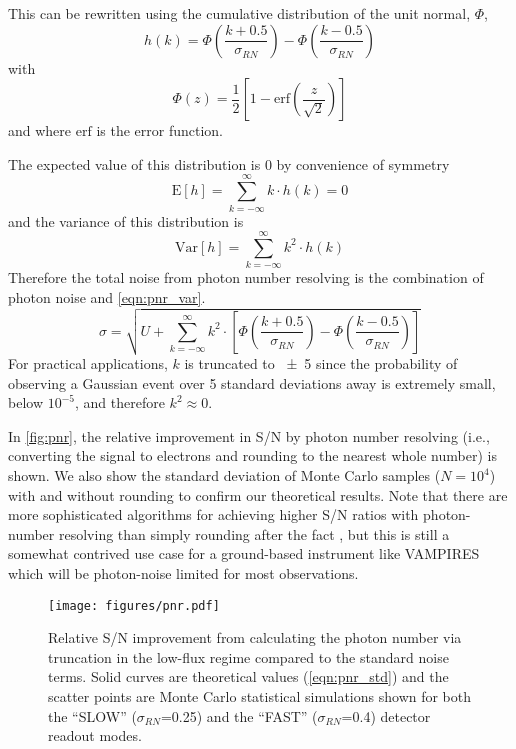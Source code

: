 This can be rewritten using the cumulative distribution of the unit normal, $\Phi$, 
\begin{equation}
    h(k) = \Phi\left(\frac{k + 0.5}{\sigma_{RN}} \right) - \Phi\left(\frac{k - 0.5}{\sigma_{RN}} \right)
\end{equation}
with
\begin{equation}
    \Phi(z) = \frac12 \left[1 - \mathrm{erf}\left(\frac{z}{\sqrt{2}}\right) \right]
\end{equation}
and where $\mathrm{erf}$ is the error function.

The expected value of this distribution is 0 by convenience of symmetry
\begin{equation}
    \mathrm{E}[h] = \sum_{k=-\infty}^{\infty}{ k \cdot h(k)} = 0
\end{equation}
and the variance of this distribution is
\begin{equation}
\label{eqn:pnr_var}
    \mathrm{Var}[h] = \sum_{k=-\infty}^{\infty}{ k^2\cdot h(k)}
\end{equation}
Therefore the total noise from photon number resolving is the combination of photon noise and \autoref{eqn:pnr_var}.
\begin{equation}
    \label{eqn:pnr_std}
    \sigma = \sqrt{U + \sum_{k=-\infty}^{\infty}{ k^2\cdot \left[\Phi\left(\frac{k + 0.5}{\sigma_{RN}} \right) - \Phi\left(\frac{k - 0.5}{\sigma_{RN}}\right)\right]}}
\end{equation}
For practical applications, $k$ is truncated to \num{\pm5} since the probability of observing a Gaussian event over 5 standard deviations away is extremely small, below $10^{-5}$, and therefore $k^2\approx0$.

In \autoref{fig:pnr}, the relative improvement in S/N by photon number resolving (i.e., converting the signal to electrons and rounding to the nearest whole number) is shown. We also show the standard deviation of Monte Carlo samples ($N=10^4$) with and without rounding to confirm our theoretical results. Note that there are more sophisticated algorithms for achieving higher S/N ratios with photon-number resolving than simply rounding after the fact \citep{harpsoe_bayesian_2012}, but this is still a somewhat contrived use case for a ground-based instrument like VAMPIRES which will be photon-noise limited for most observations.

\begin{figure}
    \centering
    \texttt{[image: figures/pnr.pdf]}
    \caption{Relative S/N improvement from calculating the photon number via truncation in the low-flux regime compared to the standard noise terms. Solid curves are theoretical values (\autoref{eqn:pnr_std}) and the scatter points are Monte Carlo statistical simulations shown for both the ``SLOW'' ($\sigma_{RN}$=\SI{0.25}{\electron}) and the ``FAST''  ($\sigma_{RN}$=\SI{0.4}{\electron})  detector readout modes.\label{fig:pnr}}
\end{figure}

